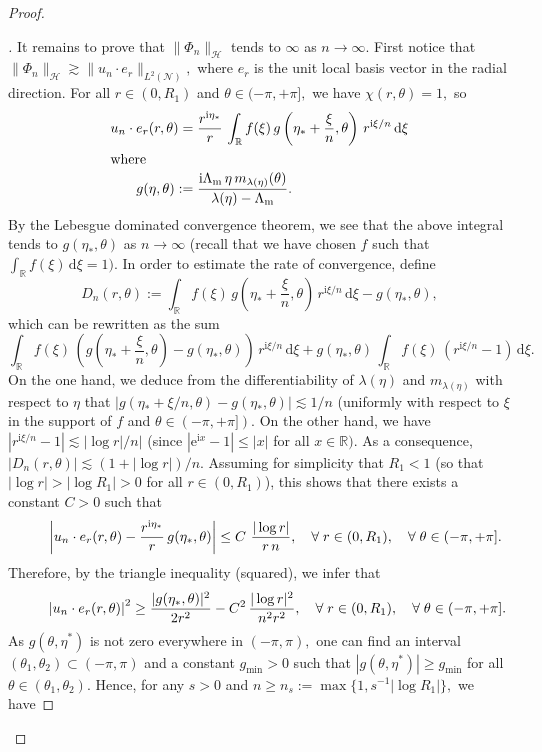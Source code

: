 \documentclass[11pt]{article}
\theoremstyle{definition}
\newenvironment{proofc}{\begin{proof}}{\end{proof}}
\numberwithin{equation}{section}
\numberwithin{figure}{section}
\numberwithin{table}{section}
\newcommand{\calH}{\mathcal{H}}
\newcommand{\calN}{\mathcal{N}}
\newcommand{\bbR}{\mathbb{R}}
\newcommand{\rmd}{{\mathrm{d}}}
\newcommand{\rme}{{\mathrm{e}}}
\newcommand{\rmi}{{\mathrm{i}}}
\newcommand{\Lm}{{\Lambda_{\mathrm{m}}}}
\newcounter{stepcount}
\renewcommand{\thestepcount}{\roman{stepcount}}
\newenvironment{step}{\refstepcounter{stepcount}\begin{proof}[\thestepcount]}{\let\qed\relax\end{proof}}
\let\oldforall\forall
\renewcommand*{\forall}{\mathrel{\oldforall}}
\begin{document}
\begin{proofc}
\begin{step}\label{listproofprop3.7.4}
It remains to prove that $\| \Phi_n \|_\calH$ tends to $\infty$ as $n \to \infty$. First notice that $\| \Phi_n \|_\calH \gtrsim \| u_n\cdot e_r \|_{L^2(\calN)},$ where $e_r$ is the unit local basis vector in the radial direction. For all $r \in (0,R_1)$ and $\theta \in (-\pi,+\pi],$ we have $\chi(r,\theta) = 1,$ so
\begin{align*}
u_n\cdot e_r(r,\theta) =&\;\frac{r^{\rmi\eta_*}}{r}\,
\int_{\bbR} f(\xi)\, g\left(\eta_* + \frac{\xi}{n},\theta\right)\,r^{\rmi\xi/n} \,\rmd \xi\\
\intertext{where}
 g(\eta,\theta) :=&\;\frac{\rmi\Lm\,\eta\,m_{\lambda(\eta)}(\theta)}{\lambda(\eta)-\Lm}.
\end{align*}
By the Lebesgue dominated convergence theorem, we see that the above integral tends to $g(\eta_*,\theta)$ as $n \to \infty$ (recall that we have chosen $f$ such that $\int_{\bbR} f(\xi) \,\rmd \xi = 1).$ In order to estimate the rate of convergence, define
\[
D_n(r,\theta) := \int_{\bbR} f(\xi)\, g\left(\eta_* + \frac{\xi}{n},\theta\right)
\,r^{\rmi\xi/n} \,\rmd \xi - g(\eta_*,\theta),
\]
which can be rewritten as the sum
\[
\int_{\bbR} f(\xi)\, \left(g\left(\eta_* + \frac{\xi}{n},\theta\right) - g(\eta_*,\theta)\right)\,r^{\rmi\xi/n} \,\rmd \xi + g(\eta_*,\theta)\,\int_{\bbR} f(\xi)\, \left(r^{\rmi\xi/n} - 1 \right) \,\rmd \xi.
\]
On the one hand, we deduce from the differentiability of $\lambda(\eta)$ and $m_{\lambda(\eta)}$ with respect to $\eta$ that $| g(\eta_* + \xi/n,\theta) - g(\eta_*,\theta)| \lesssim 1/n$ (uniformly with respect to $\xi$ in the support of $f$ and $\theta \in (-\pi,+\pi]).$ On the other hand, we have $|r^{\rmi\xi/n} - 1| \lesssim |\log r|/n|$ (since $|\rme^{\rmi x} - 1| \leq |x|$ for all $x \in \bbR).$ As a consequence, $|D_n(r,\theta)| \lesssim (1 +|\log r|)/n.$ Assuming for simplicity that $R_1 < 1$ (so that $|\log r| > |\log R_1| > 0$ for all $r \in (0,R_1)$), this shows that there exists a constant $C>0$ such that
\[
\mkern40mu\left| u_n\cdot e_r(r,\theta) - \frac{r^{\rmi\eta_*}}{r}\, g(\eta_*,\theta) \right|
\leq C\ \frac{|\log r|}{r\,n},
\quad \forall r \in (0,R_1), \quad \forall \theta \in (-\pi,+\pi].
\]
Therefore, by the triangle inequality (squared), we infer that
\[
\mkern45mu\left| u_n\cdot e_r(r,\theta) \right|^2
\geq \frac{|g(\eta_*,\theta)|^2}{2r^2} - C^2\,\frac{|\log r|^2}{n^2r^2},
\quad \forall r \in (0,R_1), \quad \forall \theta \in (-\pi,+\pi].
\]
As $g(\theta,\eta^*)$ is not zero everywhere in $(-\pi,\pi),$ one can find an interval $(\theta_1,\theta_2) \subset (-\pi,\pi)$ and a constant $g_{\min} > 0$ such that $|g(\theta,\eta^*)| \geq g_{\min}$ for all $\theta \in (\theta_1,\theta_2).$ Hence, for any $s > 0$ and $n \geq n_s := \max\big\{1,s^{-1}|\log R_1|\big\},$ we have

\end{step}
\end{proofc}
\end{document}

